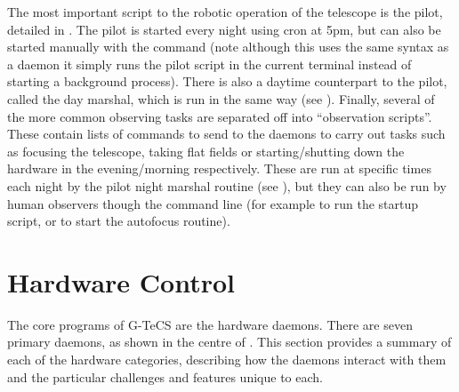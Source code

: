 \begin{colsection}
The most important script to the robotic operation of the telescope is the pilot, detailed in . The pilot is started every night using cron at 5pm, but can also be started manually with the command  (note although this uses the same syntax as a daemon it simply runs the pilot script in the current terminal instead of starting a background process). There is also a daytime counterpart to the pilot, called the day marshal, which is run in the same way (see ). Finally, several of the more common observing tasks are separated off into ``observation scripts''. These contain lists of commands to send to the daemons to carry out tasks such as focusing the telescope, taking flat fields or starting/shutting down the hardware in the evening/morning respectively. These are run at specific times each night by the pilot night marshal routine (see ), but they can also be run by human observers though the command line (for example  to run the startup script, or  to start the autofocus routine).

\end{colsection}


\section{Hardware Control}
\label{sec:hardware_control}


\begin{colsection}

The core programs of G-TeCS are the hardware daemons. There are seven primary daemons, as shown in the centre of . This section provides a summary of each of the hardware categories, describing how the daemons interact with them and the particular challenges and features unique to each.

\end{colsection}


